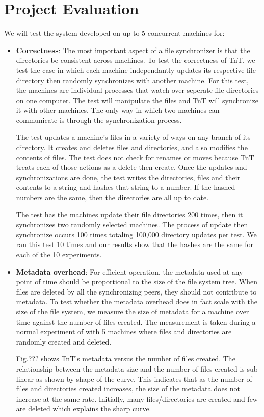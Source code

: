 \section{Project Evaluation}

We will test the system developed on up to 5 concurrent machines for:

\begin{itemize}\renewcommand{\labelitemi}{$\diamond$}
\item {\bf Correctness}: The most important aspect of a file synchronizer is that the directories be consistent across machines.  To test the correctness of TnT, we test the case in which each machine independantly updates its respective file directory then randomly synchronizes with another machine.  For this test, the machines are individual processes that watch over seperate file directories on one computer.  The test will manipulate the files and TnT will synchronize it with other machines.  The only way in which two machines can communicate is through the synchronization process.

The test updates a machine's files in a variety of ways on any branch of its directory.  It creates and deletes files and directories, and also modifies the contents of files.  The test does not check for renames or moves because TnT treats each of those actions as a delete then create.  Once the updates and synchronizations are done, the test writes the directories, files and their contents to a string and hashes that string to a number.  If the hashed numbers are the same, then the directories are all up to date.

The test has the machines update their file directories 200 times, then it synchronizes two randomly selected machines.  The process of update then synchronize occurs 100 times totaling 100,000 directory updates per test.  We ran this test 10 times and our results show that the hashes are the same for each of the 10 experiments.


\item {\bf Metadata overhead}: For efficient operation, the metadata used at any point of time should be proportional to the size of the file system tree. When files are deleted by all the synchronizing peers, they should not contribute to metadata.  To test whether the metadata overhead does in fact scale with the size of the file system, we measure the size of metadata for a machine over time against the number of files created.  The measurement is taken during a normal experiment of with 5 machines where files and directories are randomly created and deleted.  

Fig.??? shows TnT's metadata versus the number of files created.  The relationship between the metadata size and the number of files created is sub-linear as shown by shape of the curve.  This indicates that as the number of files and directories created increases, the size of the metadata does not increase at the same rate.  Initially, many files/directories are created and few are deleted which explains the sharp curve.  

\end{itemize}
